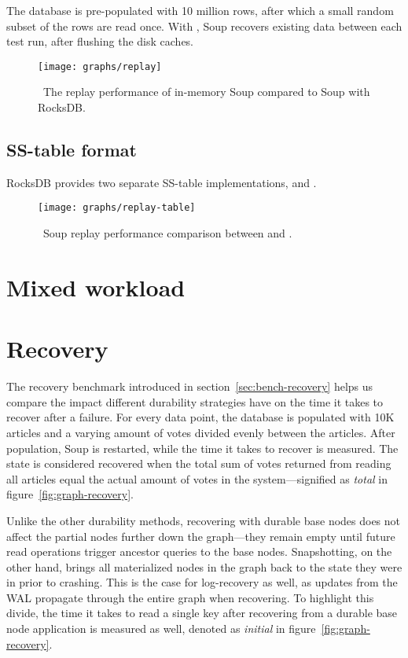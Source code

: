 The database is pre-populated with 10 million rows, after which a small random
subset of the rows are read once. With , Soup recovers
existing data between each test run, after flushing the disk caches.

\begin{figure}[H]
  \centering
  \texttt{[image: graphs/replay]}
  \caption{\
    The replay performance of in-memory Soup compared to Soup with RocksDB.\@
  }\label{fig:graph-replay}
\end{figure}

\subsection{SS-table format}

RocksDB provides two separate SS-table implementations, 
and \code{PlainTable}.


\begin{figure}[H]
  \centering
  \texttt{[image: graphs/replay-table]}
  \caption{\
    Soup replay performance comparison between  and
    .
  }\label{fig:graph-replay-table}
\end{figure}

\section{Mixed workload}

\section{Recovery}

The recovery benchmark introduced in section~\ref{sec:bench-recovery} helps us
compare the impact different durability strategies have on the time it takes to
recover after a failure. For every data point, the database is populated with
10K articles and a varying amount of votes divided evenly between the articles.
After population, Soup is restarted, while the time it takes to recover is
measured. The state is considered recovered when the total sum of votes returned from
reading all articles equal the actual amount of votes in the system---signified
as \textit{total} in figure~\ref{fig:graph-recovery}.

Unlike the other durability methods, recovering with durable base nodes does not
affect the partial nodes further down the graph---they remain empty until future
read operations trigger ancestor queries to the base nodes. Snapshotting, on the
other hand, brings all materialized nodes in the graph back to the state they
were in prior to crashing. This is the case for log-recovery as well, as updates
from the WAL propagate through the entire graph when recovering. To highlight
this divide, the time it takes to read a single key after recovering from a
durable base node application is measured as well, denoted as \textit{initial}
in figure~\ref{fig:graph-recovery}.

